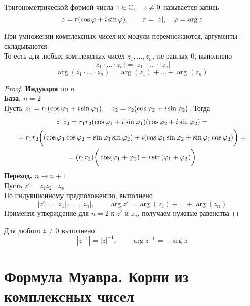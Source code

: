 \begin{definition}
	Тригонометрической формой числа $z \in \mathbb{C}, \quad z \ne 0 $ называется запись
	$$ z = r(\cos \varphi + i \sin \varphi), \qquad r = |z|, \quad \varphi = \arg z $$
\end{definition}

\begin{theorem}
	При умножении комплексных чисел их модули перемножаются, аргументы -- складываются \\
	То есть для любых комплексных чисел $z_1, ..., z_n$, не равных 0, выполнено
	$$ |z_1 \cdot ... \cdot z_n| = |z_1| \cdot ... \cdot |z_n| $$
	$$ \arg(z_1 \cdot ... \cdot z_n) = \arg(z_1) + ... + \arg(z_n) $$
\end{theorem}

\begin{proof}
	\textbf{Индукция} по $n$ \\
	\textbf{База.} $n = 2$ \\
	Пусть $z_1 = r_1 (\cos \varphi_1 + i \sin \varphi_1), \quad z_2 = r_2 (\cos \varphi_2 + i \sin \varphi_2) $. Тогда
	\begin{multline*}
		z_1z_2 = r_1r_2 (\cos \varphi_1 + i \sin \varphi_1)(\cos \varphi_2 + i \sin \varphi_2) = \\ = r_1r_2 \bigg( (\cos \varphi_1 \cos \varphi_2 - \sin \varphi_1 \sin \varphi_2) + i(\cos \varphi_1 \sin \varphi_2 + \sin \varphi_1 \cos \varphi_2) \bigg) = \\ = (r_1r_2) \bigg( \cos (\varphi_1 + \varphi_2) + i \sin (\varphi_1 + \varphi_2) \bigg)
	\end{multline*}
	\textbf{Переход.} $n \to n + 1$ \\
	Пусть $z' = z_1z_2...z_n$ \\
	По индукционному предположению, выполнено
	$$ |z'| = |z_1| \cdot ... \cdot |z_n|, \qquad \arg z' = \arg(z_1) + ... + \arg(z_n) $$
	Применяя утверждение для $n = 2$ к $z'$ и $z_n$, получаем нужные равенства
\end{proof}

\begin{implication}
	Для любого $z \ne 0$ выполнено
	$$ |z^{-1}| = |z|^{-1}, \qquad \arg z^{-1} = -\arg z $$
\end{implication}

\section{Формула Муавра. Корни из комплексных чисел}


